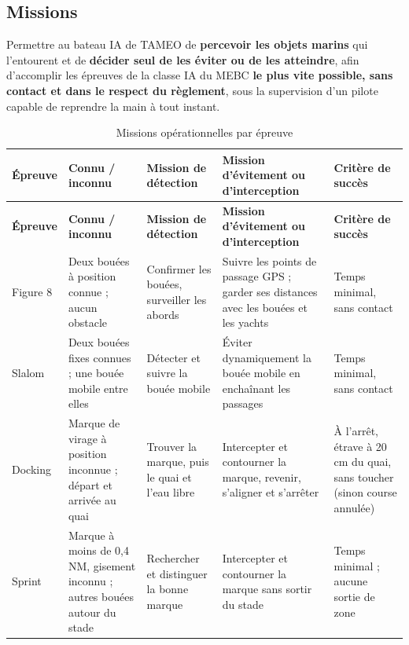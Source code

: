 \documentclass[11pt,letterpaper]{article}
\begin{document}
\subsection{Missions}

\begin{tameoBox}
Permettre au bateau IA de TAMEO de \textbf{percevoir les objets marins} qui
l'entourent et de \textbf{décider seul de les éviter ou de les atteindre},
afin d'accomplir les épreuves de la classe IA du MEBC \textbf{le plus vite
possible, sans contact et dans le respect du règlement}, sous la supervision
d'un pilote capable de reprendre la main à tout instant.
\end{tameoBox}

\begingroup
\footnotesize
{}
\begin{longtable}{L{1.75cm}L{2.75cm}L{3.0cm}L{3.4cm}L{2.9cm}}
\caption{Missions opérationnelles par épreuve}\label{tab:missions}\\
\toprule
\textbf{Épreuve} & \textbf{Connu / inconnu} & \textbf{Mission de détection} & \textbf{Mission d'évitement ou d'interception} & \textbf{Critère de succès} \\
\midrule
\endfirsthead
\toprule
\textbf{Épreuve} & \textbf{Connu / inconnu} & \textbf{Mission de détection} & \textbf{Mission d'évitement ou d'interception} & \textbf{Critère de succès} \\
\midrule
\endhead
Figure 8 & Deux bouées à position connue ; aucun obstacle & Confirmer les bouées, surveiller les abords & Suivre les points de passage GPS ; garder ses distances avec les bouées et les yachts & Temps minimal, sans contact \\
Slalom & Deux bouées fixes connues ; une bouée mobile entre elles & Détecter et suivre la bouée mobile & Éviter dynamiquement la bouée mobile en enchaînant les passages & Temps minimal, sans contact \\
Docking & Marque de virage à position inconnue ; départ et arrivée au quai & Trouver la marque, puis le quai et l'eau libre & Intercepter et contourner la marque, revenir, s'aligner et s'arrêter & À l'arrêt, étrave à 20\,cm du quai, sans toucher (sinon course annulée) \\
Sprint & Marque à moins de 0,4 NM, gisement inconnu ; autres bouées autour du stade & Rechercher et distinguer la bonne marque & Intercepter et contourner la marque sans sortir du stade & Temps minimal ; aucune sortie de zone \\
\bottomrule
\end{longtable}
\endgroup
\end{document}
